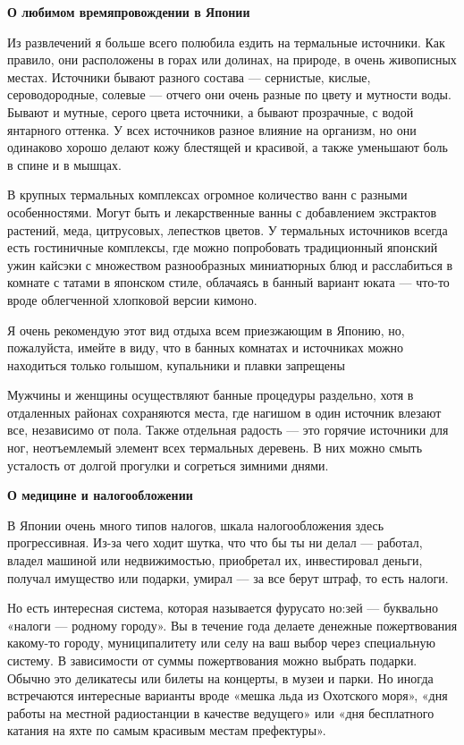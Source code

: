 \textbf{О любимом времяпровождении в Японии}

Из развлечений я больше всего полюбила ездить на термальные источники. Как правило, они расположены в горах или долинах, на природе, в очень живописных местах. Источники бывают разного состава — сернистые, кислые, сероводородные, солевые — отчего они очень разные по цвету и мутности воды. Бывают и мутные, серого цвета источники, а бывают прозрачные, с водой янтарного оттенка. У всех источников разное влияние на организм, но они одинаково хорошо делают кожу блестящей и красивой, а также уменьшают боль в спине и в мышцах.



В крупных термальных комплексах огромное количество ванн с разными особенностями. Могут быть и лекарственные ванны с добавлением экстрактов растений, меда, цитрусовых, лепестков цветов. У термальных источников всегда есть гостиничные комплексы, где можно попробовать традиционный японский ужин кайсэки с множеством разнообразных миниатюрных блюд и расслабиться в комнате с татами в японском стиле, облачаясь в банный вариант юката — что-то вроде облегченной хлопковой версии кимоно.

\begin{fancyquotes}
    Я очень рекомендую этот вид отдыха всем приезжающим в Японию, но, пожалуйста, имейте в виду, что в банных комнатах и источниках можно находиться только голышом, купальники и плавки запрещены
\end{fancyquotes}

Мужчины и женщины осуществляют банные процедуры раздельно, хотя в отдаленных районах сохраняются места, где нагишом в один источник влезают все, независимо от пола. Также отдельная радость — это горячие источники для ног, неотъемлемый элемент всех термальных деревень. В них можно смыть усталость от долгой прогулки и согреться зимними днями.

\textbf{О медицине и налогообложении }

В Японии очень много типов налогов, шкала налогообложения здесь прогрессивная. Из-за чего ходит шутка, что что бы ты ни делал — работал, владел машиной или недвижимостью, приобретал их, инвестировал деньги, получал имущество или подарки, умирал — за все берут штраф, то есть налоги.

Но есть интересная система, которая называется фурусато но:зей — буквально «налоги — родному городу». Вы в течение года делаете денежные пожертвования какому-то городу, муниципалитету или селу на ваш выбор через специальную систему. В зависимости от суммы пожертвования можно выбрать подарки. Обычно это деликатесы или билеты на концерты, в музеи и парки. Но иногда встречаются интересные варианты вроде «мешка льда из Охотского моря», «дня работы на местной радиостанции в качестве ведущего» или «дня бесплатного катания на яхте по самым красивым местам префектуры».

